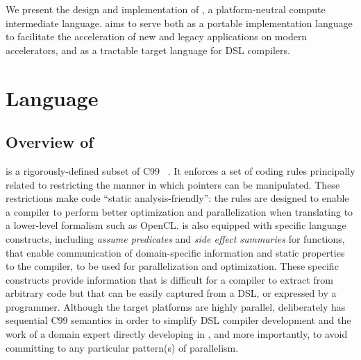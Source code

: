 % 

We present the design and implementation of \pencil, a plat\-form-neu\-tral 
compute intermediate language.
\pencil aims to serve both as a portable implementation language to facilitate 
the acceleration of new and legacy applications on modern accelerators, and as 
a tractable target language for DSL compilers.


\section{\pencil Language}

\subsection{Overview of \pencil \label{pencil-overview}}

\pencil is a rigorously-defined subset of C99~\cite{c99}%
.  It enforces a set of
coding rules principally related to restricting the manner in which pointers
can be manipulated.  These restrictions make \pencil code
``static analysis-friendly'': the rules are designed to enable a compiler
to perform better optimization and parallelization when translating \pencil
to a lower-level formalism such as OpenCL.
\pencil is also equipped with specific language constructs, including
\emph{assume predicates} and \emph{side effect summaries} for functions,
that enable communication of domain-specific information and static properties
to the \pencil compiler, to be used for parallelization and optimization.
These specific constructs provide information that is difficult for a
compiler to extract from arbitrary code but that can be easily captured from a DSL, or
expressed by a programmer.
Although the target platforms are highly parallel,
\pencil deliberately has sequential C99 semantics in order to simplify DSL
compiler development and the work of a domain expert directly
developing in \pencil, and more importantly, to avoid committing to
any particular pattern(s) of parallelism.

